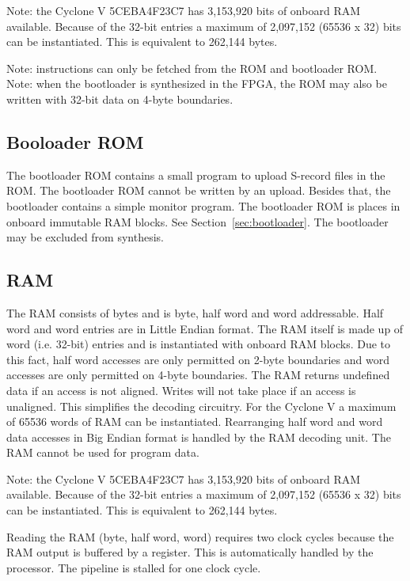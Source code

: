 \documentclass[12pt]{article}
\begin{document}
Note: the Cyclone V 5CEBA4F23C7 has 3,153,920 bits of onboard RAM available. Because of the 32-bit entries a maximum of 2,097,152 (65536 x 32) bits can be instantiated. This is equivalent to 262,144 bytes.

Note: instructions can only be fetched from the ROM and bootloader ROM. Note: when the bootloader is synthesized in the FPGA, the ROM may also be written with 32-bit data on 4-byte boundaries.

\subsection{Booloader ROM}
\label{sec:bootloaderrom}
The bootloader ROM contains a small program to upload S-record files in the ROM. The bootloader ROM cannot be written by an upload. Besides that, the bootloader contains a simple monitor program. The bootloader ROM is places in onboard immutable RAM blocks. See Section~\ref{sec:bootloader}. The bootloader may be excluded from synthesis.

\subsection{RAM}
\label{sec:ram}
The RAM consists of bytes and is byte, half word and word addressable. Half word and word entries are in Little Endian format. The RAM itself is made up of word (i.e. 32-bit) entries and is instantiated with onboard RAM blocks. Due to this fact, half word accesses are only permitted on 2-byte boundaries and word accesses are only permitted on 4-byte boundaries. The RAM returns undefined data if an access is not aligned. Writes will not take place if an access is unaligned. This simplifies the decoding circuitry. For the Cyclone V a maximum of 65536 words of RAM can be instantiated. Rearranging half word and word data accesses in Big Endian format is handled by the RAM decoding unit. The RAM cannot be used for program data.

Note: the Cyclone V 5CEBA4F23C7 has 3,153,920 bits of onboard RAM available. Because of the 32-bit entries a maximum of 2,097,152 (65536 x 32) bits can be instantiated. This is equivalent to 262,144 bytes.

Reading the RAM (byte, half word, word) requires two clock cycles because the RAM output is buffered by a register. This is automatically handled by the processor. The pipeline is stalled for one clock cycle.
\end{document}
